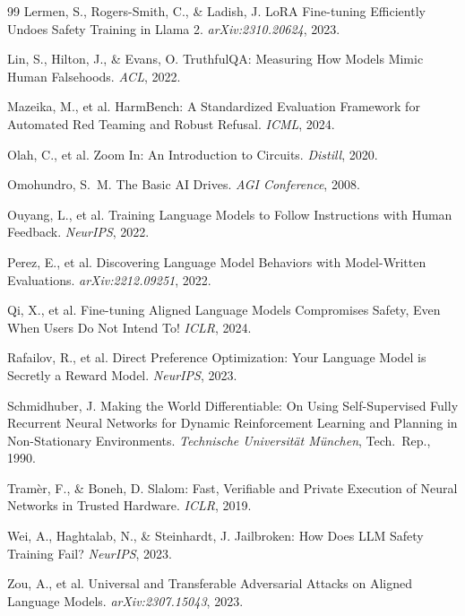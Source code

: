 \documentclass[10pt,letterpaper]{article}
\theoremstyle{definition}
\theoremstyle{plain}
\begin{document}
\begin{thebibliography}{99}
Lermen, S., Rogers-Smith, C., \& Ladish, J.
\newblock LoRA Fine-tuning Efficiently Undoes Safety Training in Llama 2.
\newblock \emph{arXiv:2310.20624}, 2023.

Lin, S., Hilton, J., \& Evans, O.
\newblock TruthfulQA: Measuring How Models Mimic Human Falsehoods.
\newblock \emph{ACL}, 2022.

Mazeika, M., et al.
\newblock HarmBench: A Standardized Evaluation Framework for Automated
Red Teaming and Robust Refusal.
\newblock \emph{ICML}, 2024.

Olah, C., et al.
\newblock Zoom In: An Introduction to Circuits.
\newblock \emph{Distill}, 2020.

Omohundro, S.~M.
\newblock The Basic AI Drives.
\newblock \emph{AGI Conference}, 2008.

Ouyang, L., et al.
\newblock Training Language Models to Follow Instructions with Human
Feedback.
\newblock \emph{NeurIPS}, 2022.

Perez, E., et al.
\newblock Discovering Language Model Behaviors with Model-Written
Evaluations.
\newblock \emph{arXiv:2212.09251}, 2022.

Qi, X., et al.
\newblock Fine-tuning Aligned Language Models Compromises Safety, Even
When Users Do Not Intend To!
\newblock \emph{ICLR}, 2024.

Rafailov, R., et al.
\newblock Direct Preference Optimization: Your Language Model is Secretly
a Reward Model.
\newblock \emph{NeurIPS}, 2023.

Schmidhuber, J.
\newblock Making the World Differentiable: On Using Self-Supervised Fully
Recurrent Neural Networks for Dynamic Reinforcement Learning and
Planning in Non-Stationary Environments.
\newblock \emph{Technische Universit\"at M\"unchen}, Tech.\ Rep., 1990.

Tram\`er, F., \& Boneh, D.
\newblock Slalom: Fast, Verifiable and Private Execution of Neural
Networks in Trusted Hardware.
\newblock \emph{ICLR}, 2019.

Wei, A., Haghtalab, N., \& Steinhardt, J.
\newblock Jailbroken: How Does LLM Safety Training Fail?
\newblock \emph{NeurIPS}, 2023.

Zou, A., et al.
\newblock Universal and Transferable Adversarial Attacks on Aligned
Language Models.
\newblock \emph{arXiv:2307.15043}, 2023.

\end{thebibliography}
\end{document}
